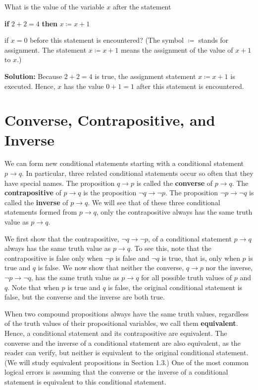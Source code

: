 \documentclass{Axon}
\begin{document}
\begin{example}\label{Example: 11}
    What is the value of the variable \(x\) after the statement
    \begin{center}
        \textbf{if} \(2 + 2 = 4\) \textbf{then} \(x \coloneq x + 1\)
    \end{center}
    if \(x = 0\) before this statement is encountered? (The symbol \(\coloneq\) stands for assignment. The statement \(x \coloneq x + 1\) means the assignment of the value of \(x + 1\) to \(x\).)
    
    \noindent
    \textbf{Solution:} Because \(2 + 2 = 4\) is true, the assignment statement \(x \coloneq x + 1\) is executed. Hence, \(x\) has the value \(0 + 1 = 1\) after this statement is encountered.
\end{example}

\section{Converse, Contrapositive, and Inverse}
We can form new conditional statements starting with a conditional statement \(p \to q\). In particular, three related conditional statements occur so often that they have special names. The proposition \(q \to p\) is called the \textbf{converse} of \(p \to q\). The \textbf{contrapositive} of \(p \to q\) is the proposition \(\lnot q \to \lnot p\). The proposition \(\lnot p \to \lnot q\) is called the \textbf{inverse} of \(p \to q\). We will see that of these three conditional statements formed from \(p \to q\), only the contrapositive always has the same truth value as \(p \to q\).

We first show that the contrapositive, \(\lnot q \to \lnot p\), of a conditional statement \(p \to q\) always has the same truth value as \(p \to q\). To see this, note that the contrapositive is false only when \(\lnot p\) is false and \(\lnot q\) is true, that is, only when \(p\) is true and \(q\) is false. We now show that neither the converse, \(q \to p\) nor the inverse, \(\lnot p \to \lnot q\), has the same truth value as \(p \to q\) for all possible truth values of \(p\) and \(q\). Note that when \(p\) is true and \(q\) is false, the original conditional statement is false, but the converse and the inverse are both true.

When two compound propositions always have the same truth values, regardless of the truth values of their propositional variables, we call them \textbf{equivalent}. Hence, a conditional statement and its contrapositive are equivalent. The converse and the inverse of a conditional statement are also equivalent, as the reader can verify, but neither is equivalent to the original conditional statement. (We will study equivalent propositions in Section 1.3.) One of the most common logical errors is assuming that the converse or the inverse of a conditional statement is equivalent to this conditional statement.
\end{document}
